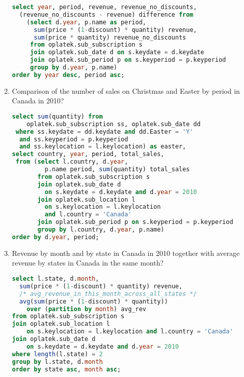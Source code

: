 \begin{enumerate}
\begin{lstlisting}[language=sql]
select year, period, revenue, revenue_no_discounts, 
  (revenue_no_discounts - revenue) difference from 
    (select d.year, p.name as period, 
      sum(price * (1-discount) * quantity) revenue, 
      sum(price * quantity) revenue_no_discounts
     from oplatek.sub_subscription s 
     join oplatek.sub_date d on s.keydate = d.keydate
     join oplatek.sub_period p on s.keyperiod = p.keyperiod
     group by d.year, p.name)
order by year desc, period asc;
\end{lstlisting}
  \item Comparison of the number of sales on Christmas and Easter by period in Canada in 2010?
\begin{lstlisting}[language=sql] 
select sum(quantity) from 
    oplatek.sub_subscription ss, oplatek.sub_date dd 
 where ss.keydate = dd.keydate and dd.Easter = 'Y' 
  and ss.keyperiod = p.keyperiod 
  and ss.keylocation = l.keylocation) as easter,
select country, year, period, total_sales, 
 from (select l.country, d.year, 
         p.name period, sum(quantity) total_sales
       from oplatek.sub_subscription s 
       join oplatek.sub_date d 
         on s.keydate = d.keydate and d.year = 2010
       join oplatek.sub_location l 
         on s.keylocation = l.keylocation 
         and l.country = 'Canada'
       join oplatek.sub_period p on s.keyperiod = p.keyperiod 
       group by l.country, d.year, p.name)
order by d.year, period;
\end{lstlisting}
  \item Revenue by month and by state in Canada in 2010 together with average revenue by states in Canada in the same month?
\begin{lstlisting}[language=sql] 
select l.state, d.month, 
  sum(price * (1-discount) * quantity) revenue,
  /* avg_revenue_in_this_month_across_all_states */
  avg(sum(price * (1-discount) * quantity)) 
    over (partition by month) avg_rev 
from oplatek.sub_subscription s 
join oplatek.sub_location l 
    on s.keylocation = l.keylocation and l.country = 'Canada' 
join oplatek.sub_date d 
    on s.keydate = d.keydate and d.year = 2010
where length(l.state) = 2
group by l.state, d.month
order by state asc, month asc;
\end{lstlisting}
\end{enumerate}

